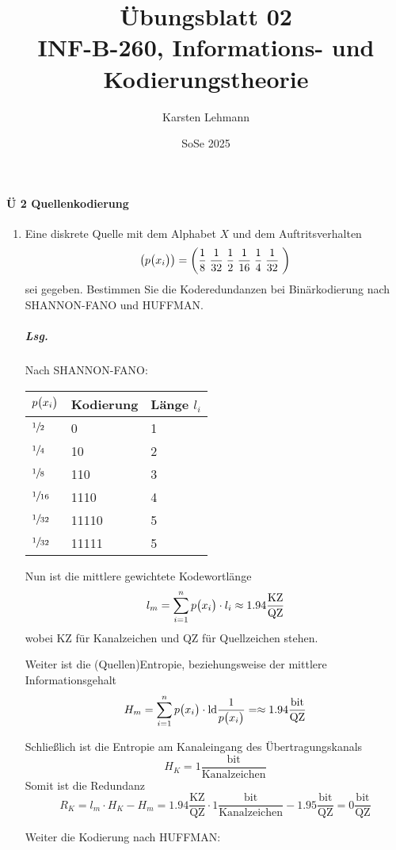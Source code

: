 \documentclass{scrreprt}
\author{Karsten Lehmann}
\date{SoSe 2025}
\title{Übungsblatt 02\\INF-B-260, Informations- und Kodierungstheorie}
\newcommand{\ld}{\text{ld}}
\begin{document}
\paragraph{Ü 2 Quellenkodierung}
\begin{enumerate}[1.]
\item Eine diskrete Quelle mit dem Alphabet $X$ und dem Auftritsverhalten
  \[
    \qty(p\qty\big(x_i)) = \qty(
      \frac{1}{8}\;
      \frac{1}{32}\;
      \frac{1}{2}\;
      \frac{1}{16}\;
      \frac{1}{4}\;
      \frac{1}{32}\;
    )
  \]
  sei gegeben.
  Bestimmen Sie die Koderedundanzen bei Binärkodierung nach SHANNON-FANO und
  HUFFMAN.

  \subparagraph{Lsg.} Nach SHANNON-FANO:

  \begin{tabularx}{\textwidth}{|X|X|X|}
    \hline
    $p\qty\big(x_i)$ & Kodierung & Länge $l_i$ \\
    \hline
    $\sfrac{1}{2}$  & 0     & 1 \\
    $\sfrac{1}{4}$  & 10    & 2 \\
    $\sfrac{1}{8}$  & 110   & 3 \\
    $\sfrac{1}{16}$ & 1110  & 4 \\
    $\sfrac{1}{32}$ & 11110 & 5 \\
    $\sfrac{1}{32}$ & 11111 & 5 \\
    \hline
  \end{tabularx}
  Nun ist die mittlere gewichtete Kodewortlänge
  \[
    l_m = \sum_{i = 1}^n p\qty\big(x_i) \cdot l_i \approx 1.94 \frac{\text{KZ}}{\text{QZ}}
  \]
  wobei KZ für Kanalzeichen und QZ für Quellzeichen stehen.

  Weiter ist die (Quellen)Entropie, beziehungsweise der mittlere Informationsgehalt
  \[
    H_m = \sum_{i = 1}^n p\qty\big(x_i) \cdot \ld \frac{1}{p\qty\big(x_i)} = \approx 1.94 \frac{\text{bit}}{\text{QZ}}
  \]

  Schließlich ist die Entropie am Kanaleingang des Übertragungskanals
  \[
    H_K = 1 \frac{\text{bit}}{\text{Kanalzeichen}}
  \]
  Somit ist die Redundanz
  \[
    R_K = l_m \cdot H_K - H_m = 1.94 \frac{\text{KZ}}{\text{QZ}} \cdot 1 \frac{\text{bit}}{\text{Kanalzeichen}} - 1.95 \frac{\text{bit}}{\text{QZ}} = 0 \frac{\text{bit}}{\text{QZ}}
  \]

  \newpage
  Weiter die Kodierung nach HUFFMAN:

\end{enumerate}
\end{document}
